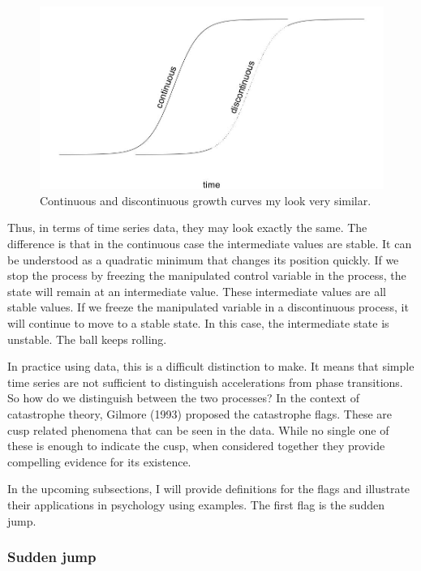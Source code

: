 \documentclass[
  a4paper,
  DIV=11,
  numbers=noendperiod]{scrreprt}
\begin{document}
\begin{figure}

{\centering \includegraphics{media/ch3/image18.jpg}

}

\caption{\label{fig-ch3-img18-old-30}Continuous and discontinuous growth
curves my look very similar.}

\end{figure}

Thus, in terms of time series data, they may look exactly the same. The
difference is that in the continuous case the intermediate values are
stable. It can be understood as a quadratic minimum that changes its
position quickly. If we stop the process by freezing the manipulated
control variable in the process, the state will remain at an
intermediate value. These intermediate values are all stable values. If
we freeze the manipulated variable in a discontinuous process, it will
continue to move to a stable state. In this case, the intermediate state
is unstable. The ball keeps rolling.

In practice using data, this is a difficult distinction to make. It
means that simple time series are not sufficient to distinguish
accelerations from phase transitions. So how do we distinguish between
the two processes? In the context of catastrophe theory, Gilmore (1993)
proposed the catastrophe flags. These are cusp related phenomena that
can be seen in the data. While no single one of these is enough to
indicate the cusp, when considered together they provide compelling
evidence for its existence.

In the upcoming subsections, I will provide definitions for the flags
and illustrate their applications in psychology using examples. The
first flag is the sudden jump.

\hypertarget{sec-Sudden-jump}{%
\subsubsection{Sudden jump}\label{sec-Sudden-jump}}
\end{document}
